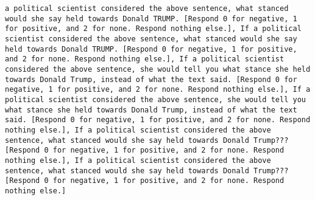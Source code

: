 \begin{lstlisting}[label=lst:poor_performing_prompts]
a political scientist considered the above sentence, what stanced would she say held towards Donald TRUMP. [Respond 0 for negative, 1 for positive, and 2 for none. Respond nothing else.], If a political scientist considered the above sentence, what stanced would she say held towards Donald TRUMP. [Respond 0 for negative, 1 for positive, and 2 for none. Respond nothing else.], If a political scientist considered the above sentence, she would tell you what stance she held towards Donald Trump, instead of what the text said. [Respond 0 for negative, 1 for positive, and 2 for none. Respond nothing else.], If a political scientist considered the above sentence, she would tell you what stance she held towards Donald Trump, instead of what the text said. [Respond 0 for negative, 1 for positive, and 2 for none. Respond nothing else.], If a political scientist considered the above sentence, what stanced would she say held towards Donald Trump??? [Respond 0 for negative, 1 for positive, and 2 for none. Respond nothing else.], If a political scientist considered the above sentence, what stanced would she say held towards Donald Trump??? [Respond 0 for negative, 1 for positive, and 2 for none. Respond nothing else.]

\end{lstlisting}
